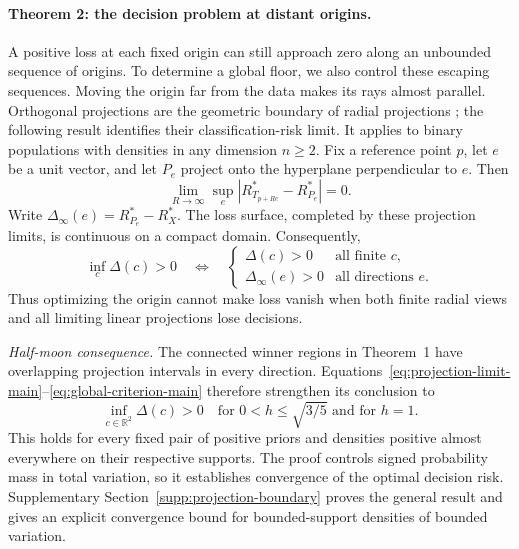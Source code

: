 \paragraph{Theorem 2: the decision problem at distant origins.}
A positive loss at each fixed origin can still approach zero along an unbounded sequence of origins. To determine a global floor, we also control these escaping sequences. Moving the origin far from the data makes its rays almost parallel. Orthogonal projections are the geometric boundary of radial projections \citep{Orponen2019}; the following result identifies their classification-risk limit. It applies to binary populations with densities in any dimension $n\geq2$. Fix a reference point $p$, let $e$ be a unit vector, and let $P_e$ project onto the hyperplane perpendicular to $e$. Then
\begin{equation}
 \lim_{R\to\infty}\sup_e
 \left|R^*_{T_{p+Re}}-R^*_{P_e}\right|=0.
 \label{eq:projection-limit-main}
\end{equation}
Write $\Delta_\infty(e)=R^*_{P_e}-R_X^*$. The loss surface, completed by these projection limits, is continuous on a compact domain. Consequently,
\begin{equation}
 \inf_c\Delta(c)>0
 \quad\Longleftrightarrow\quad
 \begin{cases}
 \Delta(c)>0&\text{all finite }c,\\
 \Delta_\infty(e)>0&\text{all directions }e.
 \end{cases}
 \label{eq:global-criterion-main}
\end{equation}
Thus optimizing the origin cannot make loss vanish when both finite radial views and all limiting linear projections lose decisions.

\emph{Half-moon consequence.}
The connected winner regions in Theorem~1 have overlapping projection intervals in every direction. Equations~\eqref{eq:projection-limit-main}--\eqref{eq:global-criterion-main} therefore strengthen its conclusion to
\begin{equation}
 \inf_{c\in\mathbb R^2}\Delta(c)>0
 \quad\text{for }0<h\leq\sqrt{3/5}\text{ and for }h=1.
 \label{eq:global-positive}
\end{equation}
This holds for every fixed pair of positive priors and densities positive almost everywhere on their respective supports. The proof controls signed probability mass in total variation, so it establishes convergence of the optimal decision risk. Supplementary Section~\ref{supp:projection-boundary} proves the general result and gives an explicit convergence bound for bounded-support densities of bounded variation.

